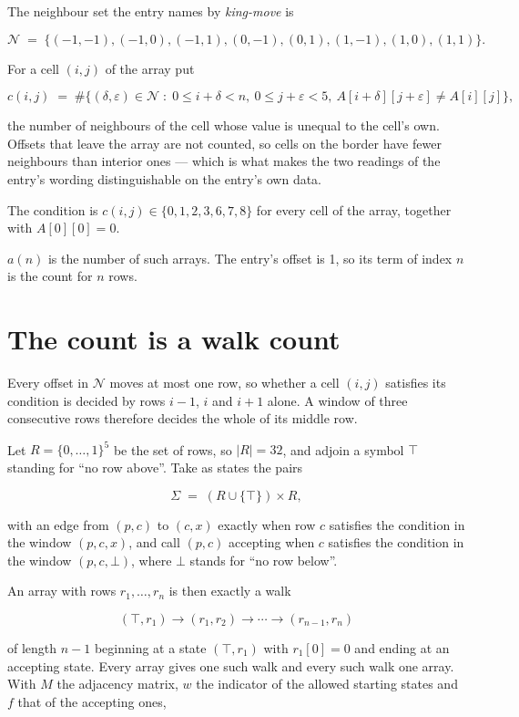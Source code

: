 \documentclass[11pt]{article}
\theoremstyle{definition}
\begin{document}
The neighbour set the entry names by {\itshape king-move} is

\[\mathcal{N} \;=\; \{(-1,-1), (-1,0), (-1,1), (0,-1), (0,1), (1,-1), (1,0), (1,1)\}.\]

For a cell $(i,j)$ of the array put

\[c(i,j) \;=\; \#\bigl\{(\delta,\varepsilon)\in\mathcal{N} \;:\; 0\le i+\delta<n,\ 0\le j+\varepsilon<5,\ A[i+\delta][j+\varepsilon] \neq A[i][j]\bigr\},\]

the number of neighbours of the cell whose value is unequal to the cell's own. Offsets that leave the array are not counted, so cells on the border have fewer neighbours than interior ones --- which is what makes the two readings of the entry's wording distinguishable on the entry's own data.

The condition is $c(i,j) \in \{0, 1, 2, 3, 6, 7, 8\}$ for every cell of the array, together with $A[0][0]=0$.

$a(n)$ is the number of such arrays. The entry's offset is 1, so its term of index $n$ is the count for $n$ rows.

\section{The count is a walk count}

Every offset in $\mathcal{N}$ moves at most one row, so whether a cell $(i,j)$ satisfies its condition is decided by rows $i-1$, $i$ and $i+1$ alone. A window of three consecutive rows therefore decides the whole of its middle row.

Let $R = \{0,\dots,1\}^{5}$ be the set of rows, so $|R| = 32$, and adjoin a symbol $\top$ standing for ``no row above''. Take as states the pairs

\[\Sigma \;=\; (R \cup \{\top\}) \times R,\]

with an edge from $(p,c)$ to $(c,x)$ exactly when row $c$ satisfies the condition in the window $(p,c,x)$, and call $(p,c)$ accepting when $c$ satisfies the condition in the window $(p,c,\bot)$, where $\bot$ stands for ``no row below''.

An array with rows $r_1,\dots,r_n$ is then exactly a walk

\[(\top,r_1) \to (r_1,r_2) \to \cdots \to (r_{n-1},r_n)\]

of length $n-1$ beginning at a state $(\top,r_1)$ with $r_1[0]=0$ and ending at an accepting state. Every array gives one such walk and every such walk one array. With $M$ the adjacency matrix, $w$ the indicator of the allowed starting states and $f$ that of the accepting ones,
\end{document}
